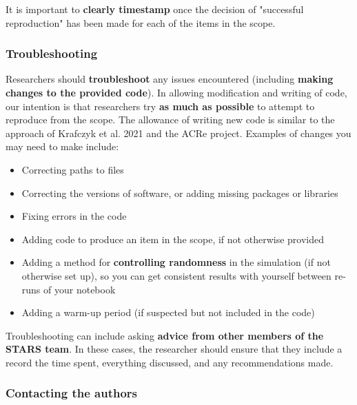 It is important to \textbf{clearly timestamp} once the decision of "successful reproduction" has been made for each of the items in the scope.

\vspace{0.5cm}
\subsubsection{Troubleshooting}

Researchers should \textbf{troubleshoot} any issues encountered (including \textbf{making changes to the provided code}). In allowing modification and writing of code, our intention is that researchers try \textbf{as much as possible} to attempt to reproduce from the scope. The allowance of writing new code is similar to the approach of Krafczyk et al. 2021\autocite{krafczyk_learning_2021} and the ACRe project\autocite{berkeley_initiative_for_transparency_in_the_social_sciences_guide_2022}. Examples of changes you may need to make include:
\begin{itemize}
    \item Correcting paths to files
    \item Correcting the versions of software, or adding missing packages or libraries
    \item Fixing errors in the code
    \item Adding code to produce an item in the scope, if not otherwise provided
    \item Adding a method for \textbf{controlling randomness} in the simulation (if not otherwise set up), so you can get consistent results with yourself between re-runs of your notebook
    \item Adding a warm-up period (if suspected but not included in the code)
\end{itemize}

Troubleshooting can include asking \textbf{advice from other members of the STARS team}. In these cases, the researcher should ensure that they include a record the time spent, everything discussed, and any recommendations made.

\vspace{0.5cm}
\subsubsection{Contacting the authors}


